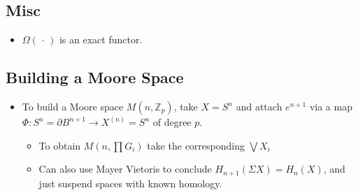 \hypertarget{misc}{%
\subsection{Misc}\label{misc}}

\begin{itemize}
\tightlist
\item
  \(\Omega({\,\cdot\,})\) is an exact functor.
\end{itemize}

\hypertarget{building-a-moore-space}{%
\subsection{Building a Moore Space}\label{building-a-moore-space}}

\begin{itemize}
\tightlist
\item
  To build a Moore space \(M(n, {\mathbb{Z}}_p)\), take \(X = S^n\) and
  attach \(e^{n+1}\) via a map
  \(\Phi: S^n = {\partial}B^{n+1}\to X^{(n)} = S^n\) of degree \(p\).

  \begin{itemize}
  \tightlist
  \item
    To obtain \(M(n, \prod G_i)\) take the corresponding \(\bigvee X_i\)
  \item
    Can also use Mayer Vietoris to conclude
    \(H_{n+1}(\Sigma X) = H_n(X)\), and just suspend spaces with known
    homology.
  \end{itemize}
\end{itemize}


\printbibliography[title=Bibliography]



